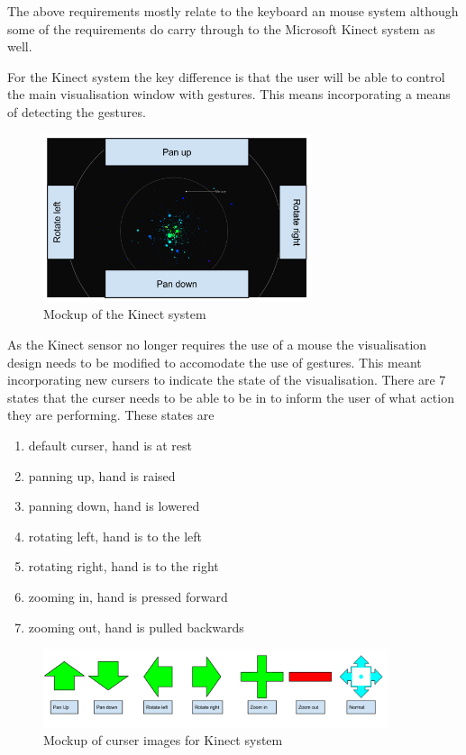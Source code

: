 \begin{enumerate}
The above requirements mostly relate to the keyboard an mouse system although some of the requirements do carry through to the Microsoft Kinect system as well. 

For the Kinect system the key difference is that the user will be able to control the main visualisation window with gestures. This means incorporating a means of detecting the gestures. 
\begin{figure}[h!]
  \centering
      \includegraphics[width=0.7\textwidth]{images/mockKinect.png}
  \caption{Mockup of the Kinect system}  
\end{figure}

As the Kinect sensor no longer requires the use of a mouse the visualisation
design needs to be modified to accomodate the use of gestures. This meant incorporating new cursers to indicate the state of the visualisation.
There are 7 states that the curser needs to be able to be in to inform the user
of what action they are performing. These states are

\begin{enumerate}
 \item default curser, hand is at rest
 \item panning up, hand is raised
 \item panning down, hand is lowered
 \item rotating left, hand is to the left
 \item rotating right, hand is to the right
 \item zooming in, hand is pressed forward
 \item zooming out, hand is pulled backwards
\end{enumerate}
\begin{figure}[h!]
  \centering
      \includegraphics[width=0.9\textwidth]{images/curserImages.png}
  \caption{Mockup of curser images for Kinect system}  
\end{figure}


\end{enumerate}
